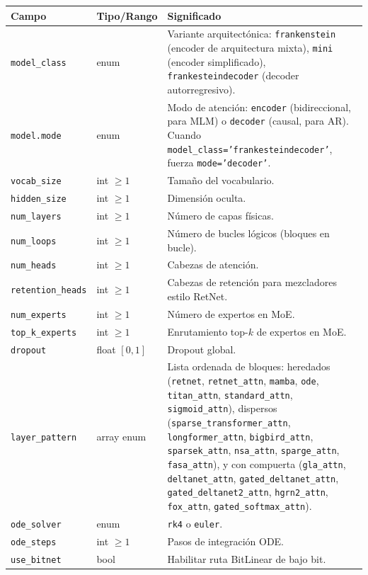 \documentclass[11pt,a4paper]{article}
\begin{document}
\small
\begin{longtable}{p{5.1cm}p{2.4cm}p{7.0cm}}
\toprule
\textbf{Campo} & \textbf{Tipo/Rango} & \textbf{Significado} \\
\midrule
\endhead
\texttt{model\_class} & enum & Variante arquitectónica: \texttt{frankenstein} (encoder de arquitectura mixta), \texttt{mini} (encoder simplificado), \texttt{frankesteindecoder} (decoder autorregresivo). \\
\texttt{model.mode} & enum & Modo de atención: \texttt{encoder} (bidireccional, para MLM) o \texttt{decoder} (causal, para AR). Cuando \texttt{model\_class='frankesteindecoder'}, fuerza \texttt{mode='decoder'}. \\
\texttt{vocab\_size} & int $\ge 1$ & Tamaño del vocabulario. \\
\texttt{hidden\_size} & int $\ge 1$ & Dimensión oculta. \\
\texttt{num\_layers} & int $\ge 1$ & Número de capas físicas. \\
\texttt{num\_loops} & int $\ge 1$ & Número de bucles lógicos (bloques en bucle). \\
\texttt{num\_heads} & int $\ge 1$ & Cabezas de atención. \\
\texttt{retention\_heads} & int $\ge 1$ & Cabezas de retención para mezcladores estilo RetNet. \\
\texttt{num\_experts} & int $\ge 1$ & Número de expertos en MoE. \\
\texttt{top\_k\_experts} & int $\ge 1$ & Enrutamiento top-$k$ de expertos en MoE. \\
\texttt{dropout} & float $[0,1]$ & Dropout global. \\
\texttt{layer\_pattern} & array enum & Lista ordenada de bloques: heredados (\texttt{retnet}, \texttt{retnet\_attn}, \texttt{mamba}, \texttt{ode}, \texttt{titan\_attn}, \texttt{standard\_attn}, \texttt{sigmoid\_attn}), dispersos (\texttt{sparse\_transformer\_attn}, \texttt{longformer\_attn}, \texttt{bigbird\_attn}, \texttt{sparsek\_attn}, \texttt{nsa\_attn}, \texttt{sparge\_attn}, \texttt{fasa\_attn}), y con compuerta (\texttt{gla\_attn}, \texttt{deltanet\_attn}, \texttt{gated\_deltanet\_attn}, \texttt{gated\_deltanet2\_attn}, \texttt{hgrn2\_attn}, \texttt{fox\_attn}, \texttt{gated\_softmax\_attn}). \\
\texttt{ode\_solver} & enum & \texttt{rk4} o \texttt{euler}. \\
\texttt{ode\_steps} & int $\ge 1$ & Pasos de integración ODE. \\
\texttt{use\_bitnet} & bool & Habilitar ruta BitLinear de bajo bit. \\

\end{longtable}
\end{document}
